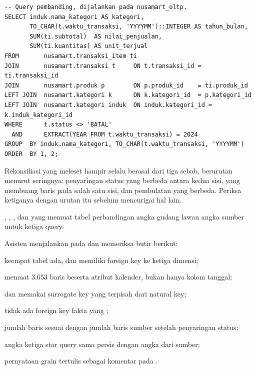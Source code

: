 \begin{lstlisting}[style=sqlgaya]
-- Query pembanding, dijalankan pada nusamart_oltp.
SELECT induk.nama_kategori AS kategori,
       TO_CHAR(t.waktu_transaksi, 'YYYYMM')::INTEGER AS tahun_bulan,
       SUM(ti.subtotal)  AS nilai_penjualan,
       SUM(ti.kuantitas) AS unit_terjual
FROM       nusamart.transaksi_item ti
JOIN       nusamart.transaksi t     ON t.transaksi_id = ti.transaksi_id
JOIN       nusamart.produk p        ON p.produk_id    = ti.produk_id
LEFT JOIN  nusamart.kategori k      ON k.kategori_id  = p.kategori_id
LEFT JOIN  nusamart.kategori induk  ON induk.kategori_id = k.induk_kategori_id
WHERE      t.status <> 'BATAL'
  AND      EXTRACT(YEAR FROM t.waktu_transaksi) = 2024
GROUP  BY induk.nama_kategori, TO_CHAR(t.waktu_transaksi, 'YYYYMM')
ORDER  BY 1, 2;
\end{lstlisting}

\begin{catatan}
Rekonsiliasi yang meleset hampir selalu berasal dari tiga sebab, berurutan
menurut seringnya: penyaringan status yang berbeda antara kedua sisi,
 yang membuang baris pada salah satu sisi, dan pembulatan
 yang berbeda. Periksa ketiganya dengan urutan itu sebelum
mencurigai hal lain.
\end{catatan}

\begin{luaran}
, , ,
dan  yang memuat tabel perbandingan angka gudang lawan
angka sumber untuk ketiga query.
\end{luaran}

\begin{checkpoint}
Asisten menjalankan  pada 
dan memeriksa butir berikut:
\begin{ceklis}
  \item keempat tabel ada, dan  memiliki foreign key
        ke ketiga dimensi;
  \item {} memuat 3.653 baris beserta atribut kalender,
        bukan hanya kolom tanggal;
  \item {} dan  memakai surrogate key
        yang terpisah dari natural key;
  \item tidak ada foreign key fakta yang ;
  \item jumlah baris  sesuai dengan jumlah baris
        sumber setelah penyaringan status;
  \item angka ketiga star query sama persis dengan angka dari sumber;
  \item pernyataan grain tertulis sebagai komentar pada .
\end{ceklis}
\end{checkpoint}

